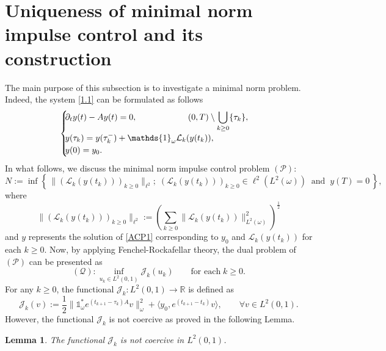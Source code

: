 \documentclass[sn-mathphys]{sn-jnl}
\newtheorem{lemma}[theorem]{Lemma}
\begin{document}
\section{Uniqueness of minimal norm impulse control and its construction}
The main purpose of this subsection is to investigate a minimal norm problem. Indeed, the system \eqref{1.1} can be formulated as follows
\begin{equation}\label{ACP1}
\begin{cases}
\hspace{-0.1cm} \partial_t y(t)-A y(t)=0, \qquad \qquad  \qquad(0,T)\setminus \displaystyle \bigcup _{k\geq 0 }\{\tau_{k}\}, \\
\hspace{-0.1cm} y(\tau_{k}) =y(\tau_{k}^-)+ \mathds{1}_{\omega} \mathcal{L}_{k}(y(t_k)),\\
\hspace{-0.1cm} y(0)=y_0. 
\end{cases}
\end{equation}
In what follows, we discuss the minimal norm impulse control problem $(\mathcal{P})$:
\begin{equation}
    N:=\inf \left\lbrace \,\|(\mathcal{L}_{k}(y(t_k)))_{k \geq 0} \|_{\ell^2}; \;(\mathcal{L}_{k}(y(t_k)))_{k\geq 0}\in \ell^2(L^2(\omega)) \;\;\text{and}\;\;y(T)=0 \,\right\rbrace,
\end{equation}
where \[\|(\mathcal{L}_{k}(y(t_k)))_{k \geq 0} \|_{\ell^2} := \left( \sum\limits_{k\geq 0}\| \mathcal{L}_{k}(y(t_k)) \|_{L^2(\omega)}^2 \right)^{\frac{1}{2}}\] 
and $y$ represents the solution of \eqref{ACP1} corresponding to $y_0$ and $\mathcal{L}_k(y(t_k))$ for each $k \geq 0$. Now, by applying Fenchel-Rockafellar theory, the dual problem of $(\mathcal{P})$ can be presented as
\[(\mathcal{Q}): \inf_{u_k \in L^2(0,1)} \mathcal{J}_k(u_k) \qquad \text{for each} \;k \geq 0.\]
For any $k \geq 0$, the functional $\mathcal{J}_k : L^2(0,1) \rightarrow \mathbb{R}$ is defined as 
        \begin{equation}
            \mathcal{J}_k(v):=\dfrac{1}{2}\|\mathds{1}_{\omega}^*e^{(t_{k+1}-\tau_k)A}v\|_{\omega}^2+\langle y_0,e^{(t_{k+1}-t_k)}v\rangle, \qquad \forall v \in L^2(0,1).
        \end{equation}
However, the functional $\mathcal{J}_k$ is not coercive as proved in the following Lemma.
\begin{lemma}\label{coerv}
    The functional $\mathcal{J}_k$ is not coercive in $L^2(0,1)$.
\end{lemma}
\end{document}
